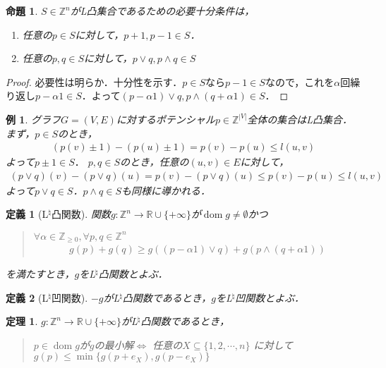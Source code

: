 \documentclass[uplatex]{jsarticle}
\newcommand{\paren}[1]{ \left( #1 \right) }
\newcommand{\abs}[1]{ \left| #1 \right| }
\newcommand{\Int}{\mathbb{Z}}
\newcommand{\Real}{\mathbb{R}}
\newcommand{\fundef}[3]{#1\colon #2 \to #3}
\DeclareMathOperator{\dom}{\mathrm{dom}}
\theoremstyle{break}
\newtheorem{theo}{定理}[section]
\newtheorem{defi}{定義}[section]
\newtheorem{prop}{命題}[section]
\newtheorem{proof}{証明}[section]
\newtheorem{example}{例}[section]
\begin{document}
\begin{prop}
  $S\in \Int^n$がL凸集合であるための必要十分条件は，
  \begin{enumerate}
    \item 任意の$p\in S$に対して，$p+1,p-1 \in S$．
    \item 任意の$p,q \in S$に対して，$p\lor q ,p\land q \in S$
  \end{enumerate}
\end{prop}
\begin{proof}
  必要性は明らか．十分性を示す．$p\in S$なら$p-1 \in S$なので，これを$\alpha$回繰り返し$p-\alpha 1 \in S$．よって$(p-\alpha 1 ) \lor q , p\land ( q+\alpha 1) \in S$．
\end{proof}
\begin{example}
  グラフ$G=(V,E)$に対するポテンシャル$p\in \Int^{\abs{V}}$全体の集合はL凸集合．まず，$p\in S$のとき，
  \begin{align*}
    (p(v)\pm 1) - (p(u) \pm 1) = p(v) - p(u) \leq l(u,v)
  \end{align*}
  よって$p\pm 1\in S．$
  $p,q\in S$のとき，任意の$(u,v) \in E$に対して，
  \begin{align*}
    (p\lor q)(v) - (p\lor q)(u) = p(v) - (p\lor q)(u) \leq p(v) - p(u) \leq l(u,v)
  \end{align*}
  よって$p\lor q\in S$．$p\land q\in S$も同様に導かれる．
\end{example}
\begin{defi}[L$^\natural$凸関数]
  関数$g\colon \Int^n \to \Real \cup \{+\infty \}$が$\dom g\neq \emptyset$かつ
  \begin{quote}
    $\forall \alpha \in \Int_{\geq 0} , \forall p,q \in \Int^n$
    \begin{align*}
      g(p)+g(q) \geq g\paren{ (p-\alpha 1)\lor q} + g\paren{ p\land (q+\alpha 1) }
    \end{align*}
  \end{quote}
  を満たすとき，$g$をL$^\natural$凸関数とよぶ．
\end{defi}
\begin{defi}[L$^\natural$凹関数]
  $-g$がL$^\natural$凸関数であるとき，$g$をL$^\natural$凹関数とよぶ．
\end{defi}
\begin{theo}
  $\fundef{g}{\Int^n}{\Real\cup \{+\infty\}}$がL$^\natural$凸関数であるとき，
  \begin{quote}
    $p\in \dom g$が$g$の最小解$\Leftrightarrow$ 任意の$X\subseteq \{1,2,\cdots,n\}$ に対して$g(p)\leq \min \{g(p+e_X),g(p-e_X)\}$
  \end{quote}
\end{theo}
\end{document}
